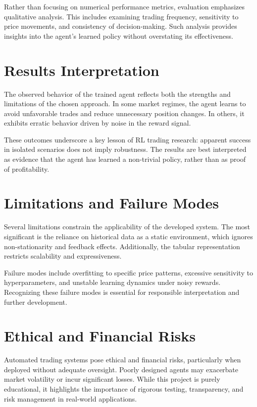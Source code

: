\documentclass[12pt]{report}
\begin{document}
Rather than focusing on numerical performance metrics, evaluation emphasizes qualitative analysis. This includes examining trading frequency, sensitivity to price movements, and consistency of decision-making. Such analysis provides insights into the agent’s learned policy without overstating its effectiveness.

\chapter{Results Interpretation}

The observed behavior of the trained agent reflects both the strengths and limitations of the chosen approach. In some market regimes, the agent learns to avoid unfavorable trades and reduce unnecessary position changes. In others, it exhibits erratic behavior driven by noise in the reward signal.

These outcomes underscore a key lesson of RL trading research: apparent success in isolated scenarios does not imply robustness. The results are best interpreted as evidence that the agent has learned a non-trivial policy, rather than as proof of profitability.

\chapter{Limitations and Failure Modes}

Several limitations constrain the applicability of the developed system. The most significant is the reliance on historical data as a static environment, which ignores non-stationarity and feedback effects. Additionally, the tabular representation restricts scalability and expressiveness.

Failure modes include overfitting to specific price patterns, excessive sensitivity to hyperparameters, and unstable learning dynamics under noisy rewards. Recognizing these failure modes is essential for responsible interpretation and further development.

\chapter{Ethical and Financial Risks}

Automated trading systems pose ethical and financial risks, particularly when deployed without adequate oversight. Poorly designed agents may exacerbate market volatility or incur significant losses. While this project is purely educational, it highlights the importance of rigorous testing, transparency, and risk management in real-world applications.
\end{document}
